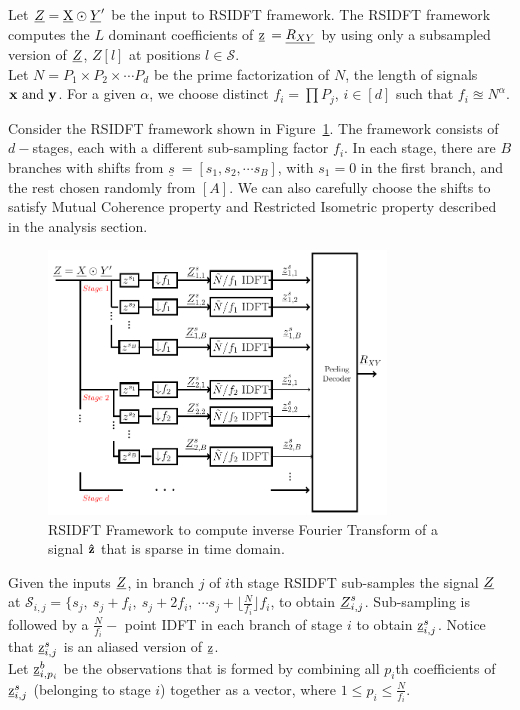 \begin{enumerate}
	  Let $ \underline{Z}  =  \underline{\mathrm{X}} \odot \underline{Y}'$ be the input to RSIDFT framework. The RSIDFT framework computes the $L$ dominant coefficients of $\underline{\mathrm{z}}$ $= {\underline{R_{XY}}}$ by using only a subsampled version of $\underline{Z}$, $Z[l]$ at positions $l \in \mathcal{S}$.\\
	  Let $N = P_1 \times P_2 \times \cdots P_d$ be the prime factorization of $N$, the length of signals $\bf x \ \text{and} \ y$. For a given $\alpha$, we choose distinct $f_i = \prod P_j$, $i \in [d]$ such that $f_i \approxeq N^{\alpha} $. 
	 
	 Consider the RSIDFT framework shown in Figure~\ref{fig:rsidft}. The framework consists of $d-$stages, each with a different sub-sampling factor $f_i$. In each stage, there are $B$ branches with shifts from $\underline{s}$$\ = [s_1, s_2, \cdots s_B] $, with $s_1 =0$ in the first branch, and the rest chosen randomly from $[A]$. We can also carefully choose the shifts to satisfy Mutual Coherence property and Restricted Isometric property described in the analysis section.
	 
	 \begin{figure}
	 	\begin{center}
	 		\includegraphics[height=7cm]{Figures/FFAST_Robust} 
	 	\end{center}	   
	 	\caption{ RSIDFT Framework to compute inverse Fourier Transform of a signal $\bf \hat{z}$ that is sparse in time domain. }\label{fig:rsidft}
	\vspace{5 pt}
	 \end{figure}	
	        
	
	 
	 Given the inputs $\underline{Z}$, in branch $j$ of $i$th stage RSIDFT sub-samples the signal $\underline{Z}$ at $\mathcal{S}_{i,j} = \{s_j,\ s_j + f_i,\ s_j + 2f_i,\ \cdots s_j + \lfloor{\frac{N}{f_i} }\rfloor f_i$, to obtain $\underline{Z}^{s}_{i,j}$. Sub-sampling is followed by a $\frac{N}{f_i}-$ point IDFT in each branch of stage $i$ to obtain $ \underline{\mathrm{z}}^{s}_{i,j}$. Notice that $ \underline{\mathrm{z}}^{s}_{i,j}$ is an aliased version of $\underline{\mathrm{z}}$. \\
	 Let $\underline{\mathrm{z}}^{b}_{i,p_i}$ be the observations that is formed by combining all $p_i$th coefficients of $\underline{\mathrm{z}}^{s}_{i,j}$ (belonging to stage $i$) together as a vector, where $1 \leq p_i \leq \frac{N}{f_i}$.
	 

\end{enumerate}
